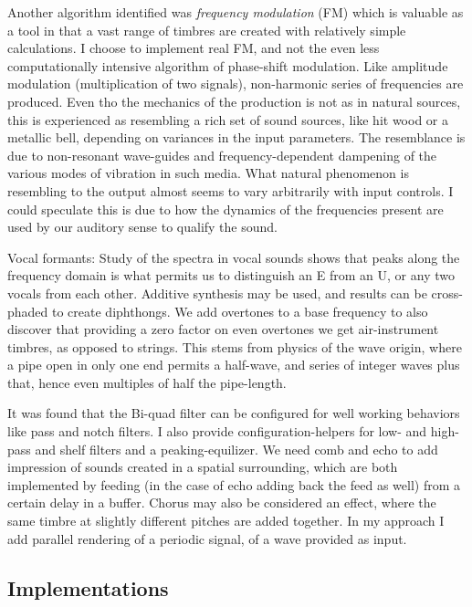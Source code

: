 \documentclass{article}
\begin{document}
Another algorithm identified was \textit{frequency modulation} (FM) which is
valuable as a tool in that a vast range of timbres are created
with relatively simple calculations.
I choose to implement real FM, and not the even
less computationally intensive algorithm of phase-shift modulation.  Like amplitude
modulation (multiplication of two signals), non-harmonic series of frequencies
are produced.  Even tho the mechanics of the production is not as in natural sources,
this is experienced as resembling a rich set of sound sources, like hit wood or
a metallic bell, depending on variances in the input parameters.  The resemblance is
due to non-resonant wave-guides and frequency-dependent dampening of
the various modes of vibration in such media.  What natural phenomenon
is resembling to the output almost seems to vary arbitrarily with input controls.
I could speculate this is due to how the dynamics of the frequencies present
are used by our auditory sense to qualify the sound.
 
Vocal formants:  Study of the spectra in vocal sounds shows that peaks along
the frequency domain is what permits us to distinguish an E from an U,
or any two vocals from each other.
Additive synthesis may be used, and results can be cross-phaded to create
diphthongs.
We add overtones to a base frequency to also discover that providing a
zero factor on even overtones we get air-instrument timbres, as opposed
to strings.
This stems from physics of the wave origin, where a pipe open in only one end
permits a half-wave, and series of integer waves plus that, hence even multiples
of half the pipe-length.

It was found that the Bi-quad filter can be configured for well working
behaviors like pass and notch filters.
I also provide configuration-helpers for low- and high- pass
and shelf filters and a peaking-equilizer.
We need comb and echo to add impression of sounds created in a spatial
surrounding, which are both implemented by feeding (in the case of echo
adding back the feed as well) from a certain delay in a buffer.
Chorus may also be considered an effect, where the same timbre at slightly
different pitches are added together.  In my approach I add parallel
rendering of a periodic signal, of a wave provided as input.

\subsection{Implementations}
\end{document}
